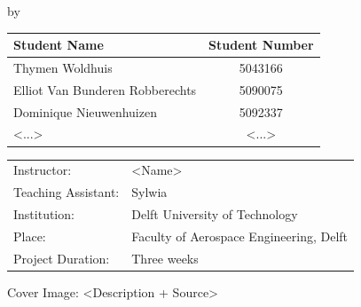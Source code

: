 \begin{titlepage}

\begin{center}

{\makeatletter
\largetitlestyle\fontsize{45}{45}\selectfont\@title
\makeatother}

{\makeatletter
\titlestyle\fontsize{20}{20}\selectfont\@subtitle    
\makeatother}

\bigskip
\bigskip

by

\bigskip
\bigskip

{\makeatletter
\largetitlestyle\fontsize{25}{25}\selectfont\@author
\makeatother}

\bigskip
\bigskip

\setlength\extrarowheight{2pt}
\begin{tabular}{lc}
    Student Name & Student Number \\\hline
    Thymen Woldhuis & 5043166 \\
    Elliot Van Bunderen Robberechts & 5090075 \\
    Dominique Nieuwenhuizen & 5092337  \\
    <...> & <...> \\
\end{tabular}

\vfill

\begin{tabular}{ll}
    Instructor: & <Name> \\
    Teaching Assistant: & Sylwia \\
    Institution: & Delft University of Technology \\
    Place: & Faculty of Aerospace Engineering, Delft \\
    Project Duration: & Three weeks
    
\end{tabular}

\vspace{1cm}
\small{Cover Image: <Description + Source>}

\end{center}


\end{titlepage}